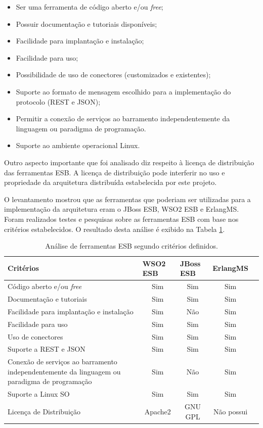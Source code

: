 \begin{itemize}
\item Ser uma ferramenta de código aberto e/ou \textit{free};
\item Possuir documentação e tutoriais disponíveis;
\item Facilidade para implantação e instalação;
\item Facilidade para uso;
\item Possibilidade de uso de conectores (customizados e existentes);
\item Suporte ao formato de mensagem escolhido para a implementação do protocolo (REST e JSON);
\item Permitir a conexão de serviços ao barramento independentemente da linguagem ou paradigma de programação.
\item Suporte ao ambiente operacional Linux.
\end{itemize}

Outro aspecto importante que foi analisado diz respeito à licença de distribuição das ferramentas ESB. A licença de distribuição pode interferir no uso e propriedade da arquitetura distribuída estabelecida por este projeto.

O levantamento mostrou que as ferramentas que poderiam ser utilizadas para a implementação da arquitetura eram o JBoss ESB, WSO2 ESB e ErlangMS. Foram realizados testes e pesquisas sobre as ferramentas ESB com base nos critérios estabelecidos. O resultado desta análise é exibido na Tabela \ref{analise_ferramentas}.


\begin{table}[!h]
\centering
\caption{Análise de ferramentas ESB segundo critérios definidos.}
\label{analise_ferramentas}
\begin{tabular}{|p{7cm}|c|c|c|c|}
\hline
Critérios & \multicolumn{1}{l|}{WSO2 ESB} & \multicolumn{1}{l|}{JBoss ESB} & \multicolumn{1}{l|}{ErlangMS} \\ \hline
Código aberto e/ou \textit{free} & Sim & Sim & Sim \\ \hline
Documentação e tutoriais         & Sim & Sim & Sim \\ \hline
Facilidade para implantação e instalação     & Sim & Não & Sim \\ \hline
Facilidade para uso              & Sim & Sim & Sim \\ \hline
Uso de conectores                & Sim & Sim & Sim \\ \hline
Suporte a REST e JSON            & Sim & Sim & Sim \\ \hline
Conexão de serviços ao barramento independentemente da linguagem ou paradigma de programação & Sim & Não & Sim \\ \hline
Suporte a Linux SO               & Sim & Sim & Sim\\ \hline
Licença de Distribuição          & Apache2 & GNU GPL & Não possui \\ \hline
\end{tabular}
\end{table}

